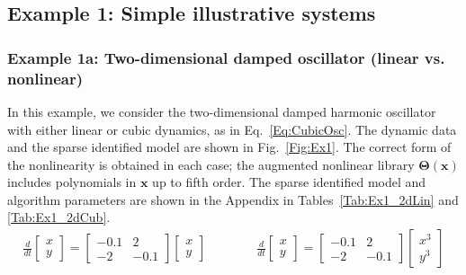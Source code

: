 \documentclass[onecolumn,11pt]{article}
\newcommand{\bx}{\mathbf{x}}
\newcommand{\bTheta}{\boldsymbol{\Theta}}
\begin{document}
\subsection{Example 1:  Simple illustrative systems}


\subsubsection{Example 1a: Two-dimensional damped oscillator (linear vs. nonlinear)}
In this example, we consider the two-dimensional damped harmonic oscillator with either linear or cubic dynamics, as in Eq.~\eqref{Eq:CubicOsc}.  The dynamic data and the sparse identified model are shown in Fig.~\ref{Fig:Ex1}.   The correct form of the nonlinearity is obtained in each case; the augmented nonlinear library $\bTheta(\bx)$ includes polynomials in $\bx$ up to fifth order.  The sparse identified model and algorithm parameters are shown in the Appendix in Tables~\ref{Tab:Ex1_2dLin} and \ref{Tab:Ex1_2dCub}.
\begin{eqnarray}
\frac{d}{dt}\begin{bmatrix} x\\ y\end{bmatrix} =\begin{bmatrix} -0.1 & 2\\ -2 & -0.1\end{bmatrix}\begin{bmatrix} x \\ y \end{bmatrix}%
\quad \quad \quad \quad
\frac{d}{dt}\begin{bmatrix} x\\ y\end{bmatrix}  =\begin{bmatrix} -0.1 & 2\\ -2 & -0.1\end{bmatrix}\begin{bmatrix} x^3 \\ y^3 \end{bmatrix}\label{Eq:CubicOsc}
\end{eqnarray}
\end{document}
